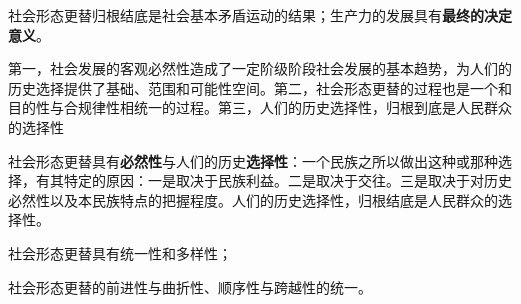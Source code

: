 {社会形态更替归根结底是社会基本矛盾运动的结果}；生产力的发展具有\textbf{{最终的决定意义}}。

第一，社会发展的客观必然性造成了一定阶级阶段社会发展的基本趋势，为人们的历史选择提供了{基础、范围和可能性空间}。第二，社会形态更替的过程也是一个{和目的性与合规律性相统一}的过程。第三，人们的历史选择性，归根到底是人民群众的选择性

社会形态更替具有\textbf{必然性}与人们的历史\textbf{选择性}：一个民族之所以做出这种或那种选择，有其特定的原因：{一是取决于民族利益。二是取决于交往。三是取决于对历史必然性以及本民族特点的把握程度。}人们的历史选择性，归根结底是人民群众的选择性。

社会形态更替具有{统一性和多样性}；

{社会形态更替的}{前进性与曲折性、}{顺序性与跨越性的统一}{。}
